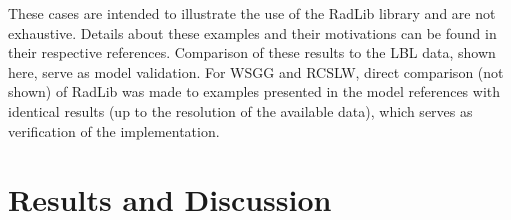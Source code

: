 \documentclass[preprint,12pt]{elsarticle}
\begin{document}
    These cases are intended to illustrate the use of the RadLib library and are not exhaustive. Details about these examples and their motivations can be found in their respective references. Comparison of these results to the LBL data, shown here, serve as model validation. For WSGG and RCSLW, direct comparison (not shown) of RadLib was made to examples presented in the model references with identical results (up to the resolution of the available data), which serves as verification of the implementation.



    \section{Results and Discussion} \label{s:discussion}
\end{document}
